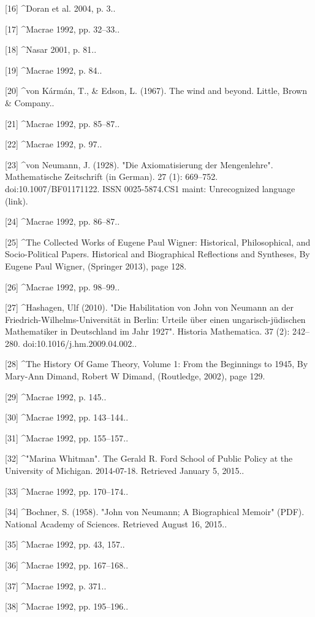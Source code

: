 [16]
^Doran et al. 2004, p. 3..

[17]
^Macrae 1992, pp. 32–33..

[18]
^Nasar 2001, p. 81..

[19]
^Macrae 1992, p. 84..

[20]
^von Kármán, T., & Edson, L. (1967). The wind and beyond. Little, Brown & Company..

[21]
^Macrae 1992, pp. 85–87..

[22]
^Macrae 1992, p. 97..

[23]
^von Neumann, J. (1928). "Die Axiomatisierung der Mengenlehre". Mathematische Zeitschrift (in German). 27 (1): 669–752. doi:10.1007/BF01171122. ISSN 0025-5874.CS1 maint: Unrecognized language (link).

[24]
^Macrae 1992, pp. 86–87..

[25]
^The Collected Works of Eugene Paul Wigner: Historical, Philosophical, and Socio-Political Papers. Historical and Biographical Reflections and Syntheses, By Eugene Paul Wigner, (Springer 2013), page 128.

[26]
^Macrae 1992, pp. 98–99..

[27]
^Hashagen, Ulf (2010). "Die Habilitation von John von Neumann an der Friedrich-Wilhelms-Universität in Berlin: Urteile über einen ungarisch-jüdischen Mathematiker in Deutschland im Jahr 1927". Historia Mathematica. 37 (2): 242–280. doi:10.1016/j.hm.2009.04.002..

[28]
^The History Of Game Theory, Volume 1: From the Beginnings to 1945, By Mary-Ann Dimand, Robert W Dimand, (Routledge, 2002), page 129.

[29]
^Macrae 1992, p. 145..

[30]
^Macrae 1992, pp. 143–144..

[31]
^Macrae 1992, pp. 155–157..

[32]
^"Marina Whitman". The Gerald R. Ford School of Public Policy at the University of Michigan. 2014-07-18. Retrieved January 5, 2015..

[33]
^Macrae 1992, pp. 170–174..

[34]
^Bochner, S. (1958). "John von Neumann; A Biographical Memoir" (PDF). National Academy of Sciences. Retrieved August 16, 2015..

[35]
^Macrae 1992, pp. 43, 157..

[36]
^Macrae 1992, pp. 167–168..

[37]
^Macrae 1992, p. 371..

[38]
^Macrae 1992, pp. 195–196..

